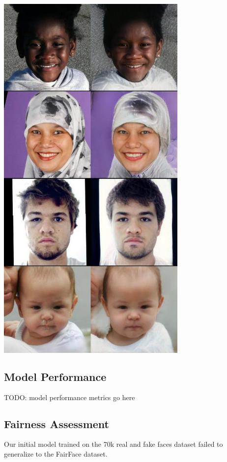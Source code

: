 \documentclass[11pt, letterpaper]{article}
\newenvironment{Figure}
  {\par\medskip\noindent\minipage{\linewidth}}
  {\endminipage\par\medskip}
\begin{document}
\begin{multicols}{2}
  \begin{Figure}
    \centering
    \includegraphics[width=0.7\textwidth]{figures/fair2fake.jpg}
    \label{fair2fake}
  \end{Figure}

  \subsection{Model Performance}

  TODO: model performance metrics go here

  \subsection{Fairness Assessment}

  Our initial model trained on the 70k real and fake faces dataset failed to
  generalize to the FairFace dataset.


\end{multicols}
\end{document}
